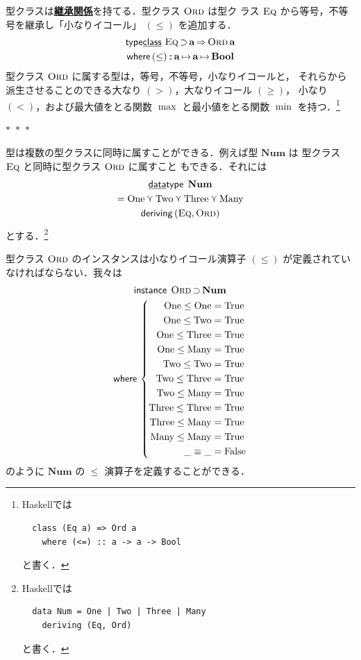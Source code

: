 \documentclass[a5paper,twoside,fleqn]{jsbook}
\newcommand{\separator}{\begin{center}$*$~$*$~$*$\end{center}}
\newcommand{\programminglanguage}[1]{\textsf{#1}}
\newcommand{\haskell}{\programminglanguage{Haskell}}
\newcommand{\keyword}[1]{{\underline{\textbf{#1}}}}
\newcommand{\mKeyword}[1]{\mathsf{#1}} %
\newcommand{\mKeywordUnderline}[1]{\text{\underline{\textsf{#1}}}} %
\newcommand{\mDataTypeKeyword}{\mKeywordUnderline{data}\mKeyword{type}}
\newcommand{\mDerivingKeyword}{\mKeyword{deriving}}
\newcommand{\mInstanceKeyword}{\mKeyword{instance}}
\newcommand{\mTypeClassKeyword}{\mKeyword{type}\mKeywordUnderline{class}}
\newcommand{\mWhereKeyword}{\mKeyword{where}}
\DeclareMathOperator{\mDataType}{\mDataTypeKeyword}
\DeclareMathOperator{\mDeriving}{\mDerivingKeyword}
\DeclareMathOperator{\mInstance}{\mInstanceKeyword}
\DeclareMathOperator{\mSuperClass}{\Rightarrow}
\DeclareMathOperator{\mSuperSet}{\supset}
\DeclareMathOperator{\mTypeClass}{\mTypeClassKeyword}
\DeclareMathOperator{\mWhere}{\mWhereKeyword}
\newcommand{\mConstant}[1]{\mathrm{#1}}
\newcommand{\mSpecialConstant}[1]{\textrm{#1}} %
\newcommand{\mFalse}{\mSpecialConstant{False}}
\newcommand{\mNumOne}{\mSpecialConstant{One}}
\newcommand{\mNumTwo}{\mSpecialConstant{Two}}
\newcommand{\mNumThree}{\mSpecialConstant{Three}}
\newcommand{\mNumMany}{\mSpecialConstant{Many}}
\newcommand{\mTrue}{\mSpecialConstant{True}}
\newcommand{\mAnyParam}{\_}
\DeclareMathOperator{\mIn}{{:\!:}}
\DeclareMathOperator{\mMapsTo}{\mapsto}
\DeclareMathOperator{\mValueOr}{\curlyvee}
\newcommand{\mType}[1]{\mathbf{#1}}
\newcommand{\mBoolType}{\mType{Bool}}
\newcommand{\mGenericTypeClass}[1]{\textsc{#1}} %
\newcommand{\mEqTypeClass}{\mGenericTypeClass{Eq}}
\newcommand{\mOrdTypeClass}{\mGenericTypeClass{Ord}}
\newcommand{\mProj}[2]{#1\mMapsTo#2}
\begin{document}
型クラスは\keyword{継承関係}を持てる．型クラス $\mOrdTypeClass$ は型ク
ラス $\mEqTypeClass$ から等号，不等号を継承し「小なりイコール」
$(\le)$ を追加する．
\begin{multline}
\mTypeClass\,
\mEqTypeClass\mSuperSet\mType{a}
\mSuperClass\mathop{\mOrdTypeClass}\mType{a}\\
\mWhere{}
(\le)\mIn\mProj{\mType{a}}{\mProj{\mType{a}}{\mBoolType}}
\end{multline}
型クラス $\mOrdTypeClass$ に属する型は，等号，不等号，小なりイコールと，
それらから派生させることのできる大なり $(>)$，大なりイコール $(\ge)$，
小なり $(<)$，および最大値をとる関数 $\max$ と最小値をとる関数 $\min$
を持つ．\footnote{\haskell では
\begin{verbatim}
  class (Eq a) => Ord a
    where (<=) :: a -> a -> Bool
\end{verbatim}
と書く．}

\separator

型は複数の型クラスに同時に属すことができる．例えば型 $\mType{Num}$ は
型クラス $\mEqTypeClass$ と同時に型クラス $\mOrdTypeClass$ に属すこと
もできる．それには
\begin{multline}
\mDataType\;\mType{Num}\\
=\mNumOne\mValueOr\mNumTwo\mValueOr\mNumThree\mValueOr\mNumMany\\
\mDeriving{}(\mEqTypeClass,\mOrdTypeClass)
\end{multline}
とする．\footnote{\haskell では
\begin{verbatim}
  data Num = One | Two | Three | Many
    deriving (Eq, Ord)
\end{verbatim}
と書く．}

型クラス $\mOrdTypeClass$ のインスタンスは小なりイコール演算子 $(\le)$
が定義されていなければならない．我々は
\begin{multline}
\mInstance\;
\mOrdTypeClass\mSuperSet\mType{Num}\\
\mWhere{}
\left\{
\begin{aligned}
\mConstant{One}\le\mConstant{One}&=\mTrue\\
\mConstant{One}\le\mConstant{Two}&=\mTrue\\
\mConstant{One}\le\mConstant{Three}&=\mTrue\\
\mConstant{One}\le\mConstant{Many}&=\mTrue\\
\mConstant{Two}\le\mConstant{Two}&=\mTrue\\
\mConstant{Two}\le\mConstant{Three}&=\mTrue\\
\mConstant{Two}\le\mConstant{Many}&=\mTrue\\
\mConstant{Three}\le\mConstant{Three}&=\mTrue\\
\mConstant{Three}\le\mConstant{Many}&=\mTrue\\
\mConstant{Many}\le\mConstant{Many}&=\mTrue\\
\mAnyParam\equiv\mAnyParam&=\mFalse
\end{aligned}
\right.
\end{multline}
のように $\mType{Num}$ の $\le$ 演算子を定義することができる．
\end{document}
